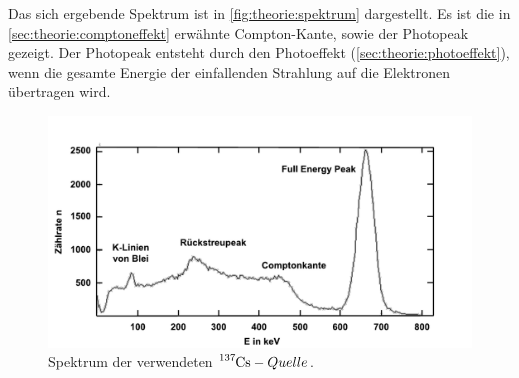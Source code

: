     Das sich ergebende Spektrum ist in \autoref{fig:theorie:spektrum} dargestellt.
    Es ist die in \autoref{sec:theorie:comptoneffekt} erwähnte Compton-Kante,
    sowie der Photopeak gezeigt.
    Der Photopeak entsteht durch den Photoeffekt (\autoref{sec:theorie:photoeffekt}),
    wenn die gesamte Energie der einfallenden Strahlung auf die Elektronen übertragen wird.
    \begin{figure}
       \centering
       \includegraphics[width=\textwidth]{content/img/cs137-spektrum_Leifi.pdf}
       \caption{Spektrum der verwendeten $\ce{^{137}Cs}-Quelle$. \cite{caesium}}
       \label{fig:theorie:spektrum}
    \end{figure}

